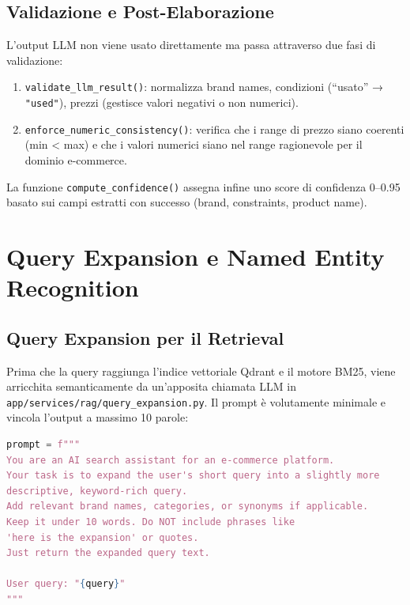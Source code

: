 \subsection{Validazione e Post-Elaborazione}
\label{subsec:parser-validation}

L'output LLM non viene usato direttamente ma passa attraverso due fasi
di validazione:

\begin{enumerate}
    \item \texttt{validate\_llm\_result()}: normalizza brand names,
        condizioni (``usato'' → \texttt{"used"}), prezzi (gestisce
        valori negativi o non numerici).
    \item \texttt{enforce\_numeric\_consistency()}: verifica che i range
        di prezzo siano coerenti (min < max) e che i valori numerici siano
        nel range ragionevole per il dominio e-commerce.
\end{enumerate}

La funzione \texttt{compute\_confidence()} assegna infine uno score
di confidenza 0–0.95 basato sui campi estratti con successo
(brand, constraints, product name).


\section{Query Expansion e Named Entity Recognition}
\label{sec:query-expansion}

\subsection{Query Expansion per il Retrieval}
\label{subsec:query-expansion}

Prima che la query raggiunga l'indice vettoriale Qdrant e il motore BM25,
viene arricchita semanticamente da un'apposita chiamata LLM in
\texttt{app/services/rag/query\_expansion.py}. Il prompt è volutamente
minimale e vincola l'output a massimo 10 parole:

\begin{lstlisting}[language=Python,caption={Prompt di query expansion (app/services/rag/query\_expansion.py)},label=lst:query-expansion]
prompt = f"""
You are an AI search assistant for an e-commerce platform.
Your task is to expand the user's short query into a slightly more
descriptive, keyword-rich query.
Add relevant brand names, categories, or synonyms if applicable.
Keep it under 10 words. Do NOT include phrases like
'here is the expansion' or quotes.
Just return the expanded query text.

User query: "{query}"
"""
\end{lstlisting}

